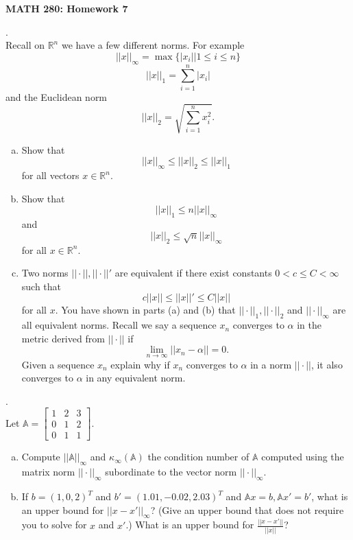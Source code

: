 \documentclass[12 pt]{article}
\begin{document}
\centerline{\bf MATH 280: Homework 7}
\bigskip

. \\
Recall on $\mathbb{R}^n$ we have a few different norms. For example
$$
||x||_{\infty}=\max\{ |x_i| | 1 \leq i \leq n \}
$$
$$
||x||_{1}=\sum_{i=1}^n |x_i|
$$
and the Euclidean norm
$$
||x||_{2}=\sqrt{\sum_{i=1}^n x_i^2}.
$$
\begin{enumerate}[a)]
\item
  Show that $$||x||_{\infty} \leq ||x||_2 \leq ||x||_1$$ for all vectors $x
  \in \mathbb{R}^n$.
  
  \item
  Show that $$||x||_1 \leq n ||x||_{\infty}$$ and $$||x||_2 \leq \sqrt{n} ||x||_{\infty}$$ for all $x \in \mathbb{R}^n$.
  
  \item
  Two norms $||\cdot||, ||\cdot||'$ are equivalent if there exist constants $0 < c \leq C < \infty$ such that
  $$c||x|| \leq ||x||' \leq C||x||$$ for all $x$. You have shown in parts (a) and (b) that $||\cdot||_1, ||\cdot||_2$ and $||\cdot||_{\infty}$
  are all equivalent norms. Recall we say a sequence $x_n$ converges to $\alpha$ in the metric derived from $|| \cdot ||$ if
  $$ \lim_{n \to \infty} ||x_n - \alpha|| = 0.$$
  Given a sequence $x_n$ explain why if $x_n$ converges to $\alpha$ in a norm $|| \cdot ||$, it also converges to $\alpha$
  in any equivalent norm.
  \end{enumerate}
\medskip

.
\\
Let $\mathbb{A} = \begin{bmatrix} 1 & 2 & 3 \\ 0 & 1 & 2 \\ 0 & 1 & 1 \end{bmatrix}$.
\begin{enumerate}[a)]
\item
  Compute $||\mathbb{A}||_{\infty}$ and $\kappa_{\infty}(\mathbb{A})$ the condition number of $\mathbb{A}$ computed
  using the matrix norm $||\cdot ||_{\infty}$ subordinate to the vector norm $|| \cdot ||_{\infty}$.
  
  \noindent
  \item If $b=(1,0,2)^T$ and $b'=(1.01,-0.02, 2.03)^T$ and $\mathbb{A}x=b,
  \mathbb{A}x'=b'$, what is an upper bound for $||x-x'||_{\infty}$? (Give an upper bound that does not require you to solve for $x$ and $x'$.) What is an upper bound for $\frac{||x-x'||}{||x||}$?
  
  \end{enumerate}
  \medskip
  
\end{document}
